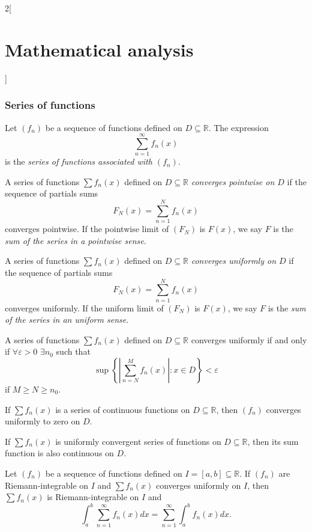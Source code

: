 \documentclass[class=article,crop=false]{standalone}
\begin{document}
\begin{multicols}{2}[\section{Mathematical analysis}]
\subsubsection*{Series of functions}
\begin{definition}
Let $(f_n)$ be a sequence of functions defined on $D\subseteq\mathbb{R}$. The expression $$\sum_{n=1}^\infty f_n(x)$$ is the \textit{series of functions associated with $(f_n)$}.
\end{definition}
\begin{definition}
A series of functions $\sum f_n(x)$ defined on $D\subseteq\mathbb{R}$ \textit{converges pointwise on $D$} if the sequence of partials sums $$F_N(x)=\sum_{n=1}^Nf_n(x)$$ converges pointwise. If the pointwise limit of $(F_N)$ is $F(x)$, we say $F$ is the \textit{sum of the series in a pointwise sense}.
\end{definition}
\begin{definition}
A series of functions $\sum f_n(x)$ defined on $D\subseteq\mathbb{R}$ \textit{converges uniformly on $D$} if the sequence of partials sums $$F_N(x)=\sum_{n=1}^Nf_n(x)$$ converges uniformly. If the uniform limit of $(F_N)$ is $F(x)$, we say $F$ is the \textit{sum of the series in an uniform sense}.
\end{definition}
\begin{theorem}
A series of functions $\sum f_n(x)$ defined on $D\subseteq\mathbb{R}$ converges uniformly if and only if $\forall\varepsilon>0$ $\exists n_0$ such that $$\sup\left\{\left|\sum_{n=N}^Mf_n(x)\right|:x\in D\right\}< \varepsilon$$ if $M\geq N\geq n_0$.
\end{theorem}
\begin{corollary}
If $\sum f_n(x)$ is a series of continuous functions on $D\subseteq\mathbb{R}$, then $(f_n)$ converges uniformly to zero on $D$.
\end{corollary}
\begin{theorem}
If $\sum f_n(x)$ is uniformly convergent series of functions on $D\subseteq\mathbb{R}$, then its sum function is also continuous on $D$.
\end{theorem}
\begin{theorem}
Let $(f_n)$ be a sequence of functions defined on $I=[a,b]\subseteq\mathbb{R}$. If $(f_n)$ are Riemann-integrable on $I$ and $\sum f_n(x)$ converges uniformly on $I$, then $\sum f_n(x)$ is Riemann-integrable on $I$ and $$\int_a^b\sum_{n=1}^\infty f_n(x) dx=\sum_{n=1}^\infty \int_a^bf_n(x) dx.$$
\end{theorem}
\begin{theorem}

\end{theorem}
\end{multicols}
\end{document}
